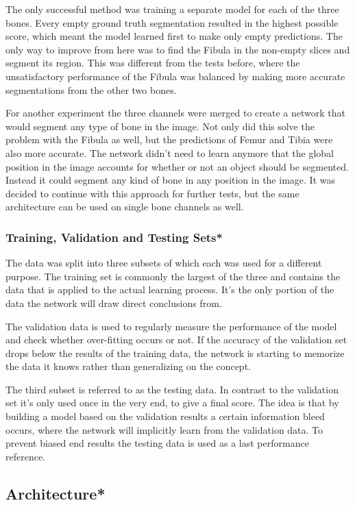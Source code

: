 The only successful method was training a separate model for each of the three bones. Every empty ground truth segmentation resulted in the highest possible score, which meant the model learned first to make only empty predictions. The only way to improve from here was to find the Fibula in the non-empty slices and segment its region. This was different from the tests before, where the unsatisfactory performance of the Fibula was balanced by making more accurate segmentations from the other two bones.

For another experiment the three channels were merged to create a network that would segment any type of bone in the image. Not only did this solve the problem with the Fibula as well, but the predictions of Femur and Tibia were also more accurate. The network didn't need to learn anymore that the global position in the image accounts for whether or not an object should be segmented. Instead it could segment any kind of bone in any position in the image. It was decided to continue with this approach for further tests, but the same architecture can be used on single bone channels as well. 

\subsubsection{Training, Validation and Testing Sets*}

The data was split into three subsets of which each was used for a different purpose. The training set is commonly the largest of the three and contains the data that is applied to the actual learning process. It's the only portion of the data the network will draw direct conclusions from. 

The validation data is used to regularly measure the performance of the model and check whether over-fitting occurs or not. If the accuracy of the validation set drops below the results of the training data, the network is starting to memorize the data it knows rather than generalizing on the concept. 

The third subset is referred to as the testing data. In contrast to the validation set it's only used once in the very end, to give a final score. The idea is that by building a model based on the validation results a certain information bleed occurs, where the network will implicitly learn from the validation data. To prevent biased end results the testing data is used as a last performance reference.

\subsection{Architecture*}

